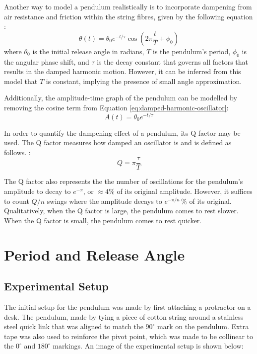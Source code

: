 \documentclass[12pt]{article}
\begin{document}
\begin{multicols}{2}
Another way to model a pendulum realistically is to incorporate dampening from air resistance and friction within the string fibres, given by the following equation \cite{damped-oscillations}:
\begin{equation} \label{eq:damped-harmonic-oscillator}
    \theta(t) = \theta_0 e^{-{t/\tau}} \cos\left(2\pi\frac{t}{T} + \phi_0\right)
\end{equation}
where $\theta_0$ is the initial release angle in radians, $T$ is the pendulum's period, $\phi_0$ is the angular phase shift, and $\tau$ {\color{blue} is the decay constant that governs all factors that results in the damped harmonic motion. However, it can be inferred from this model that $T$ is constant, implying the presence of small angle approximation.}

{\color{blue}
Additionally, the amplitude-time graph of the pendulum can be modelled by removing the cosine term from Equation \ref{eq:damped-harmonic-oscillator}:
\begin{equation} \label{eq:amplitude-function}
    A(t) = \theta_0 e^{-{t/\tau}}
\end{equation}}

In order to quantify the dampening effect of a pendulum, its Q factor may be used. The Q factor measures how damped an oscillator is and is defined as follows. \cite{pnp-physics}:
\begin{equation} \label{eq:q-factor-formula}
    Q = \pi\frac{\tau}{T}
\end{equation}

The Q factor also represents the the number of oscillations for the pendulum's amplitude to decay to $e^{-\pi}$, or $\approx 4\%$ of its original amplitude. {\color{blue}However, it suffices to count $Q/n$ swings where the amplitude decays to $e^{-\pi/n}\,\%$ of its original. Qualitatively, when the Q factor is large, the pendulum comes to rest slower. When the Q factor is small, the pendulum comes to rest quicker.}

\end{multicols}

\newpage

\section{Period and Release Angle}

\subsection{Experimental Setup}
The initial setup for the pendulum was made by first attaching a protractor on a desk. The pendulum, made by tying a piece of cotton string around a stainless steel quick link {\color{blue} that was aligned to match the $90^{\circ}$ mark on the pendulum. Extra tape was also used to reinforce the pivot point, which was made to be collinear to the $0^{\circ}$ and $180^{\circ}$ markings.} An image of the experimental setup is shown below:
\end{document}
